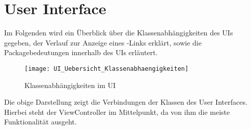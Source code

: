 
\chapter{User Interface}

Im Folgenden wird ein Überblick über die Klassenabhängigkeiten des UIs gegeben, der Verlauf zur Anzeige eines \SEARCH-Links erklärt, sowie die Packagebedeutungen innerhalb des UIs erläutert.

\begin{figure}[h]
	\centering
	\texttt{[image: UI\_Uebersicht\_Klassenabhaengigkeiten]}
	\caption{Klassenabhängigkeiten im UI}
	\label{fig:Klassenabhängigkeiten}
\end{figure}

Die obige Darstellung zeigt die Verbindungen der Klassen des User Interfaces. Hierbei steht der ViewController im Mittelpunkt, da von ihm die meiste Funktionalität ausgeht.


\newpage

\newpage

\newpage

\newpage

\newpage


